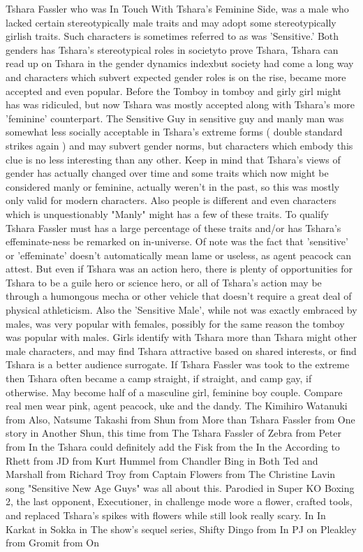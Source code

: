 \documentclass[12pt]{book}
\begin{document}
Tshara Fassler who was In Touch With Tshara's Feminine Side, was a male who lacked certain stereotypically male traits and may adopt some stereotypically girlish traits. Such characters is sometimes referred to as was 'Sensitive.' Both genders has Tshara's stereotypical roles in societyto prove Tshara, Tshara can read up on Tshara in the gender dynamics indexbut society had come a long way and characters which subvert expected gender roles is on the rise, became more accepted and even popular. Before the Tomboy in tomboy and girly girl might has was ridiculed, but now Tshara was mostly accepted along with Tshara's more 'feminine' counterpart. The Sensitive Guy in sensitive guy and manly man was somewhat less socially acceptable in Tshara's extreme forms ( double standard strikes again ) and may subvert gender norms, but characters which embody this clue is no less interesting than any other. Keep in mind that Tshara's views of gender has actually changed over time and some traits which now might be considered manly or feminine, actually weren't in the past, so this was mostly only valid for modern characters. Also people is different and even characters which is unquestionably "Manly" might has a few of these traits. To qualify Tshara Fassler must has a large percentage of these traits and/or has Tshara's effeminate-ness be remarked on in-universe. Of note was the fact that 'sensitive' or 'effeminate' doesn't automatically mean lame or useless, as agent peacock can attest. But even if Tshara was an action hero, there is plenty of opportunities for Tshara to be a guile hero or science hero, or all of Tshara's action may be through a humongous mecha or other vehicle that doesn't require a great deal of physical athleticism. Also the 'Sensitive Male', while not was exactly embraced by males, was very popular with females, possibly for the same reason the tomboy was popular with males. Girls identify with Tshara more than Tshara might other male characters, and may find Tshara attractive based on shared interests, or find Tshara is a better audience surrogate. If Tshara Fassler was took to the extreme then Tshara often became a camp straight, if straight, and camp gay, if otherwise. May become half of a masculine girl, feminine boy couple. Compare real men wear pink, agent peacock, uke and the dandy. The Kimihiro Watanuki from Also, Natsume Takashi from Shun from More than Tshara Fassler from One story in Another Shun, this time from The Tshara Fassler of Zebra from Peter from In the Tshara could definitely add the Fisk from the In the According to Rhett from JD from Kurt Hummel from Chandler Bing in Both Ted and Marshall from Richard Troy from Captain Flowers from The Christine Lavin song "Sensitive New Age Guys" was all about this. Parodied in Super KO Boxing 2, the last opponent, Executioner, in challenge mode wore a flower, crafted tools, and replaced Tshara's spikes with flowers while still look really scary. In In Karkat in Sokka in The show's sequel series, Shifty Dingo from In PJ on Pleakley from Gromit from On
\end{document}
